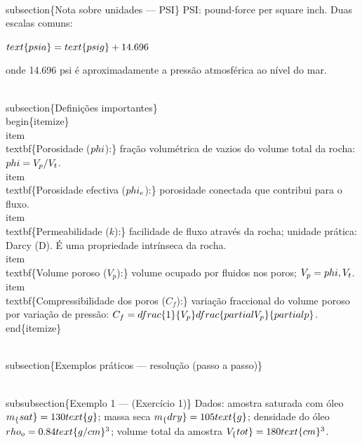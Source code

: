 \documentclass[11pt,a4paper]{article}
\begin{document}
\begin{enumerate}
{\\subsection\{Nota sobre unidades — PSI\}
PSI: pound‑force per square inch. Duas escalas comuns:

$\\text\{psia\} = \\text\{psig\} + 14.696$

onde 14.696 psi é aproximadamente a pressão atmosférica ao nível do mar.

\\subsection\{Definições importantes\}
\\begin\{itemize\}
\\item \\textbf\{Porosidade ($\\phi$):\} fração volumétrica de vazios do volume total da rocha: $\\phi = V_p / V_t$.
\\item \\textbf\{Porosidade efectiva ($\\phi_e$):\} porosidade conectada que contribui para o fluxo.
\\item \\textbf\{Permeabilidade ($k$):\} facilidade de fluxo através da rocha; unidade prática: Darcy (D). É uma propriedade intrínseca da rocha.
\\item \\textbf\{Volume poroso ($V_p$):\} volume ocupado por fluidos nos poros; $V_p=\\phi\\,V_t$.
\\item \\textbf\{Compressibilidade dos poros ($C_f$):\} variação fraccional do volume poroso por variação de pressão: $C_f=\\dfrac\{1\}\{V_p\}\\dfrac\{\\partial V_p\}\{\\partial p\}$.
\\end\{itemize\}

\\subsection\{Exemplos práticos — resolução (passo a passo)\}

\\subsubsection\{Exemplo 1 — (Exercício 1)\}
Dados: amostra saturada com óleo $m_\{sat\}=130\\ \\text\{g\}$; massa seca $m_\{dry\}=105\\ \\text\{g\}$; densidade do óleo $\\rho_o=0.84\\ \\text\{g/cm\}^3$; volume total da amostra $V_\{tot\}=180\\ \\text\{cm\}^3$.

}
\end{enumerate}
\end{document}
